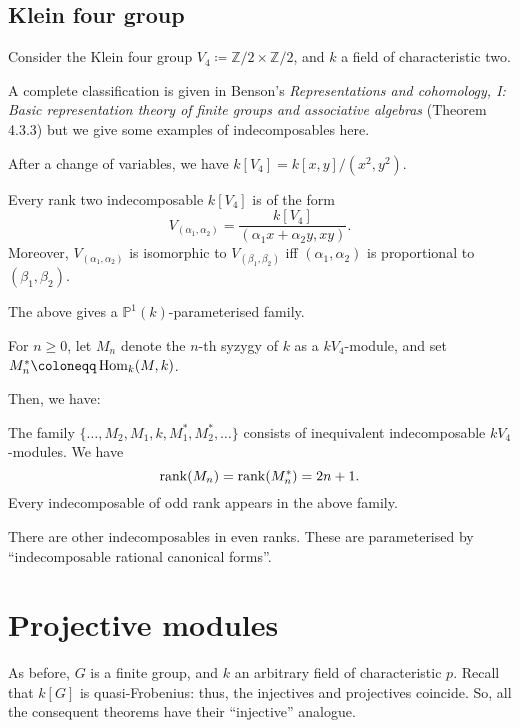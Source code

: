 \documentclass[12pt]{article}
\begin{document}
\subsection{Klein four group}

Consider the Klein four group $V_{4} \coloneqq \mathbb{Z}/2 \times \mathbb{Z}/2$, and $k$ a field of characteristic two. 

A complete classification is given in Benson's \emph{Representations and cohomology, I: Basic representation theory of finite groups and associative algebras} (Theorem 4.3.3) 
but we give some examples of indecomposables here.

After a change of variables, we have $k[V_{4}] = k[x, y]/(x^{2}, y^{2})$. 

\begin{ex}
	Every rank two indecomposable $k[V_{4}]$ is of the form 
	\begin{equation*} 
		V_{(\alpha_{1}, \alpha_{2})} = \frac{k[V_{4}]}{(\alpha_{1} x + \alpha_{2} y, xy)}.
	\end{equation*}
	Moreover, $V_{(\alpha_{1}, \alpha_{2})}$ is isomorphic to $V_{(\beta_{1}, \beta_{2})}$ iff 
	$(\alpha_{1}, \alpha_{2})$ is proportional to $(\beta_{1}, \beta_{2})$.
\end{ex}
The above gives a $\mathbb{P}^{1}(k)$-parameterised family.

For $n \ge 0$, let $M_{n}$ denote the $n$-th syzygy of $k$ as a $kV_{4}$-module, 
and set $M_{n}^{\ast} \coloneqq \Hom_{k}(M, k)$. 

Then, we have:
\begin{ex}
	The family $\{\ldots, M_{2}, M_{1}, k, M_{1}^{\ast}, M_{2}^{\ast}, \ldots\}$ consists of inequivalent indecomposable $kV_{4}$-modules. 
	We have
	\begin{equation*} 
		\operatorname{rank}(M_{n}) = \operatorname{rank}(M_{n}^{\ast}) = 2n + 1.
	\end{equation*}
	Every indecomposable of odd rank appears in the above family.
\end{ex}

There are other indecomposables in even ranks. 
These are parameterised by ``indecomposable rational canonical forms''. 

\section{Projective modules}

As before, $G$ is a finite group, and $k$ an arbitrary field of characteristic $p$. 
Recall that $k[G]$ is quasi-Frobenius: thus, the injectives and projectives coincide. 
So, all the consequent theorems have their ``injective'' analogue.
\end{document}
